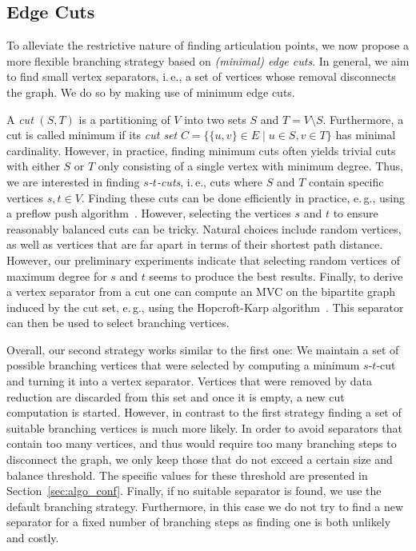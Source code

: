 \documentclass[a4paper,UKenglish,cleveref, autoref, thm-restate]{lipics-v2021}
\newcommand{\ie}{i.\,e.,\xspace}
\newcommand{\eg}{e.\,g.,\xspace}
\begin{document}
\subsection{Edge Cuts}
To alleviate the restrictive nature of finding articulation points, we now propose a more flexible branching strategy based on \emph{(minimal) edge cuts}.
In general, we aim to find small vertex separators, \ie a set of vertices whose removal disconnects the graph.
We do so by making use of minimum edge cuts.

A \emph{cut} $(S,T)$ is a partitioning of $V$ into two sets $S$ and $T=V\setminus S$.
Furthermore, a cut is called minimum if its \emph{cut set} $C = \{\{u,v\} \in E \mid u \in S, v \in T\}$ has minimal cardinality.
However, in practice, finding minimum cuts often yields trivial cuts with either $S$ or $T$ only consisting of a single vertex with minimum degree. 
Thus, we are interested in finding \emph{$s$-$t$-cuts}, \ie cuts where $S$ and $T$ contain specific vertices $s,t \in V$.
Finding these cuts can be done efficiently in practice, \eg using a preflow push algorithm~\cite{goldberg1988new}.
However, selecting the vertices $s$ and $t$ to ensure reasonably balanced cuts can be tricky.
Natural choices include random vertices, as well as vertices that are far apart in terms of their shortest path distance.
However, our preliminary experiments indicate that selecting random vertices of maximum degree
 for $s$ and $t$ seems to produce the best results.
Finally, to derive a vertex separator from a cut one can compute an MVC on the bipartite graph induced by the cut set, \eg using the Hopcroft-Karp algorithm~\cite{hopcroft1973n}.
This separator can then be used to select branching vertices.

Overall, our second strategy works similar to the first one: We maintain a set of possible branching vertices that were selected by computing a minimum $s$-$t$-cut and turning it into a vertex separator.
Vertices that were removed by data reduction are discarded from this set and once it is empty, a new cut computation is started.
However, in contrast to the first strategy finding a set of suitable branching vertices is much more likely.
In order to avoid separators that contain too many vertices, and thus would require too many branching steps to disconnect the graph, we only keep those that do not exceed a certain size and balance threshold.
The specific values for these threshold are presented in Section~\ref{sec:algo_conf}.
Finally, if no suitable separator is found, we use the default branching strategy.
Furthermore, in this case we do not try to find a new separator for a fixed number of branching steps as finding one is both unlikely and costly.
\end{document}
